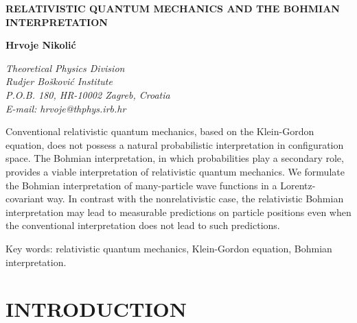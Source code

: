 \documentclass[11pt]{article}
\begin{document}
\noindent
\Large
{\bf RELATIVISTIC QUANTUM MECHANICS AND THE BOHMIAN INTERPRETATION}
\normalsize
\vspace*{1cm}

\noindent
{\bf Hrvoje Nikoli\'c}

\vspace*{0.5cm}
\noindent
{\it
Theoretical Physics Division \\
Rudjer Bo\v{s}kovi\'{c} Institute \\
P.O.B. 180, HR-10002 Zagreb, Croatia \\
E-mail: hrvoje@thphys.irb.hr}

\vspace*{2cm}

\noindent
Conventional relativistic quantum mechanics, based on the Klein-Gordon 
equation, does not possess a natural probabilistic interpretation
in configuration space.
The Bohmian interpretation, in which probabilities play a secondary 
role, provides a viable interpretation of relativistic quantum 
mechanics. We formulate the Bohmian interpretation of many-particle 
wave functions in a Lorentz-covariant way.
In contrast with the nonrelativistic case, the relativistic 
Bohmian interpretation may lead to measurable predictions on particle 
positions even when 
the conventional interpretation does not lead to such predictions. 
\vspace*{0.5cm}

\noindent
Key words: relativistic quantum mechanics, Klein-Gordon equation, 
Bohmian interpretation.

\section{INTRODUCTION}
\label{secI}
\end{document}

